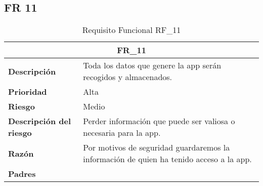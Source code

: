 \documentclass{scrreprt}
\begin{document}
\subsection{FR 11}
    \begin{table}[H]
        \label{tab:my-table}
        \begin{tabular}{|p{5cm}|p{11cm}|}
        \hline
        \multicolumn{2}{|c|}{\textbf{FR_11}} \\
        \hline
        \textbf{Descripción  }                      &  Toda los datos que genere la app serán recogidos y almacenados.                                                                      \\ \hline
        \textbf{Prioridad}                          & Alta                                                                                              \\ \hline
        \textbf{Riesgo}                          & Medio                                                                                                \\ \hline
        \textbf{Descripción del riesgo}                    &  Perder información que puede ser valiosa o necesaria para la app.                                \\ \hline
        \textbf{Razón}                   & Por motivos de seguridad guardaremos la información de quien ha tenido acceso a la app.                                                                                                                \\ \hline
        \textbf{Padres}                               &  \\  \hline
        \end{tabular}%
        
        \caption{Requisito Funcional RF_11}
\end{table}
\end{document}
